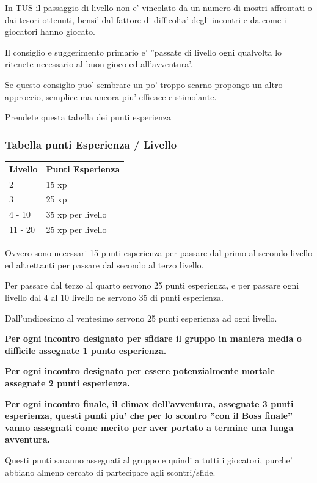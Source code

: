 \documentclass[a4paper,11pt,twoside,openany]{book}
\begin{document}
{In TUS il passaggio di livello non e' vincolato da un numero di mostri affrontati o dai tesori ottenuti, bensi' dal fattore di difficolta' degli incontri e da come i giocatori hanno giocato.

Il consiglio e suggerimento primario e' ''passate di livello ogni qualvolta lo ritenete necessario al buon gioco ed all'avventura'.

Se questo consiglio puo' sembrare un po' troppo scarno propongo un altro approccio, semplice ma ancora piu' efficace e stimolante.

Prendete questa tabella dei punti esperienza

\subsubsection{Tabella punti Esperienza / Livello}

\label{tabella-punti-esperienza-livello}

\begin{tabular}{ll}
\toprule
\textbf{Livello} & \textbf{Punti Esperienza}\tabularnewline
2 & 15 xp\tabularnewline
3 & 25 xp\tabularnewline
4 - 10 & 35 xp per livello\tabularnewline
11 - 20 & 25 xp per livello\tabularnewline
\end{tabular}

\bigskip

Ovvero sono necessari 15 punti esperienza per passare dal primo al secondo livello ed altrettanti per passare dal secondo al terzo livello.

Per passare dal terzo al quarto servono 25 punti esperienza, e per passare ogni livello dal 4 al 10 livello ne servono 35 di punti esperienza.

Dall'undicesimo al ventesimo servono 25 punti esperienza ad ogni livello.

\textbf{Per ogni incontro designato per sfidare il gruppo in maniera media o difficile assegnate 1 punto esperienza.}

\textbf{Per ogni incontro designato per essere potenzialmente mortale assegnate 2 punti esperienza.}

\textbf{Per ogni incontro finale, il climax dell'avventura, assegnate 3 punti esperienza, questi punti piu' che per lo scontro ''con il Boss finale'' vanno assegnati come merito per aver portato a termine una lunga avventura.}

Questi punti saranno assegnati al gruppo e quindi a tutti i giocatori, purche' abbiano almeno cercato di partecipare agli scontri/sfide.

}
\end{document}
